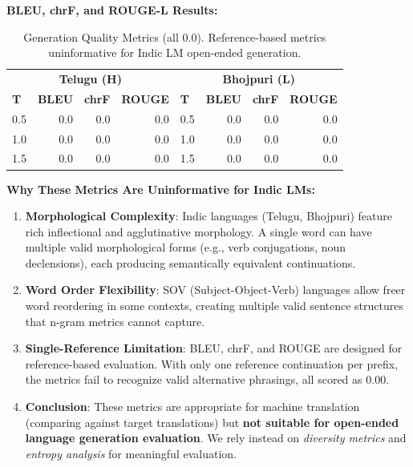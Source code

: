 \documentclass[11pt,a4paper]{article}
\begin{document}
\textbf{BLEU, chrF, and ROUGE-L Results:}

\begin{table}[H]
\centering
\small
\begin{tabular}{lrrr|lrrr}
\toprule
\multicolumn{4}{c}{\textbf{Telugu (H)}} & \multicolumn{4}{c}{\textbf{Bhojpuri (L)}} \\
\textbf{T} & \textbf{BLEU} & \textbf{chrF} & \textbf{ROUGE} & \textbf{T} & \textbf{BLEU} & \textbf{chrF} & \textbf{ROUGE} \\
\midrule
0.5 & 0.0 & 0.0 & 0.0 & 0.5 & 0.0 & 0.0 & 0.0 \\
1.0 & 0.0 & 0.0 & 0.0 & 1.0 & 0.0 & 0.0 & 0.0 \\
1.5 & 0.0 & 0.0 & 0.0 & 1.5 & 0.0 & 0.0 & 0.0 \\
\bottomrule
\end{tabular}
\caption{Generation Quality Metrics (all 0.0). Reference-based metrics uninformative for Indic LM open-ended generation.}
\label{table:generation_metrics}
\end{table}

\textbf{Why These Metrics Are Uninformative for Indic LMs:}

\begin{enumerate}
    \item \textbf{Morphological Complexity}: Indic languages (Telugu, Bhojpuri) feature rich inflectional and agglutinative morphology. A single word can have multiple valid morphological forms (e.g., verb conjugations, noun declensions), each producing semantically equivalent continuations.

    \item \textbf{Word Order Flexibility}: SOV (Subject-Object-Verb) languages allow freer word reordering in some contexts, creating multiple valid sentence structures that n-gram metrics cannot capture.

    \item \textbf{Single-Reference Limitation}: BLEU, chrF, and ROUGE are designed for reference-based evaluation. With only one reference continuation per prefix, the metrics fail to recognize valid alternative phrasings, all scored as 0.00.

    \item \textbf{Conclusion}: These metrics are appropriate for machine translation (comparing against target translations) but \textbf{not suitable for open-ended language generation evaluation}. We rely instead on \textit{diversity metrics} and \textit{entropy analysis} for meaningful evaluation.
\end{enumerate}
\end{document}
